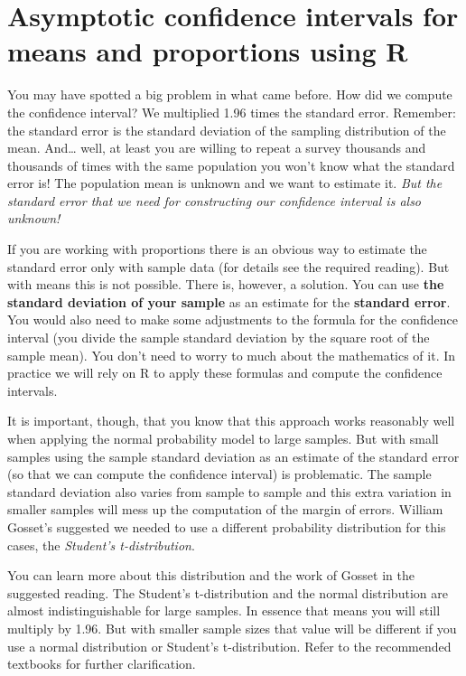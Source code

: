 \documentclass[
]{book}
\begin{document}
\section{Asymptotic confidence intervals for means and proportions using R}\label{asymptotic-confidence-intervals-for-means-and-proportions-using-r}

You may have spotted a big problem in what came before. How did we compute the confidence interval? We multiplied 1.96 times the standard error. Remember: the standard error is the standard deviation of the sampling distribution of the mean. And\ldots{} well, at least you are willing to repeat a survey thousands and thousands of times with the same population you won't know what the standard error is! The population mean is unknown and we want to estimate it. \emph{But the standard error that we need for constructing our confidence interval is also unknown!}

If you are working with proportions there is an obvious way to estimate the standard error only with sample data (for details see the required reading). But with means this is not possible. There is, however, a solution. You can use \textbf{the standard deviation of your sample} as an estimate for the \textbf{standard error}. You would also need to make some adjustments to the formula for the confidence interval (you divide the sample standard deviation by the square root of the sample mean). You don't need to worry to much about the mathematics of it. In practice we will rely on R to apply these formulas and compute the confidence intervals.

It is important, though, that you know that this approach works reasonably well when applying the normal probability model to large samples. But with small samples using the sample standard deviation as an estimate of the standard error (so that we can compute the confidence interval) is problematic. The sample standard deviation also varies from sample to sample and this extra variation in smaller samples will mess up the computation of the margin of errors. William Gosset's suggested we needed to use a different probability distribution for this cases, the \emph{Student's t-distribution}.

You can learn more about this distribution and the work of Gosset in the suggested reading. The Student's t-distribution and the normal distribution are almost indistinguishable for large samples. In essence that means you will still multiply by 1.96. But with smaller sample sizes that value will be different if you use a normal distribution or Student's t-distribution. Refer to the recommended textbooks for further clarification.
\end{document}
